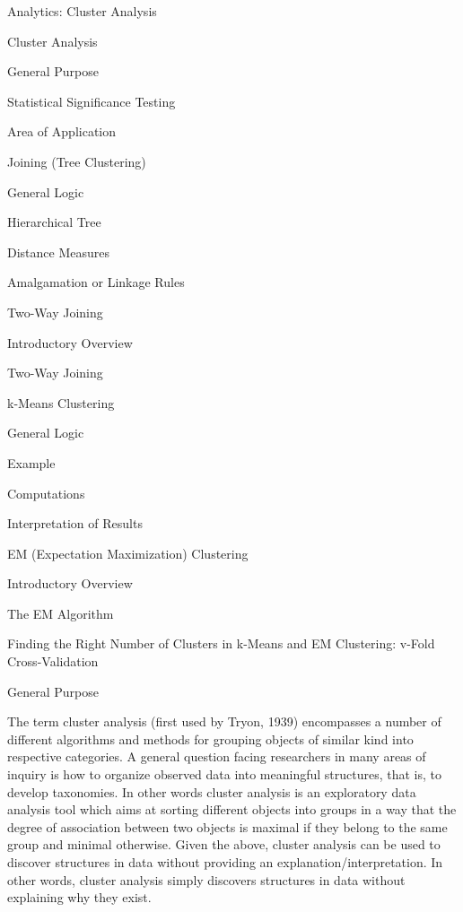 
Analytics: Cluster Analysis


Cluster Analysis

General Purpose

Statistical Significance Testing

Area of Application

Joining (Tree Clustering)

General Logic

Hierarchical Tree

Distance Measures

Amalgamation or Linkage Rules

Two-Way Joining

Introductory Overview

Two-Way Joining

k-Means Clustering

General Logic

Example

Computations

Interpretation of Results

EM (Expectation Maximization) Clustering

Introductory Overview

The EM Algorithm

Finding the Right Number of Clusters in k-Means and EM Clustering: v-Fold Cross-Validation


General Purpose

The term cluster analysis (first used by Tryon, 1939) encompasses a number of different algorithms and methods for grouping objects of similar kind into respective categories. A general question facing researchers in many areas of inquiry is how to organize observed data into meaningful structures, that is, to develop taxonomies. In other words cluster analysis is an exploratory data analysis tool which aims at sorting different objects into groups in a way that the degree of association between two objects is maximal if they belong to the same group and minimal otherwise. Given the above, cluster analysis can be used to discover structures in data without providing an explanation/interpretation. In other words, cluster analysis simply discovers structures in data without explaining why they exist.

